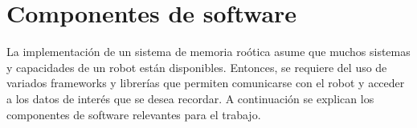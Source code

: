 %
%
%
%
%
%
%
%
%





\section{Componentes de software}

La implementaci\'on de un sistema de memoria ro\'otica asume que muchos sistemas y capacidades de un robot est\'an disponibles. Entonces, se requiere del uso de variados frameworks y librer\'ias que permiten comunicarse con el robot y acceder a los datos de inter\'es que se desea recordar. A continuaci\'on se explican los componentes de software relevantes para el trabajo.

